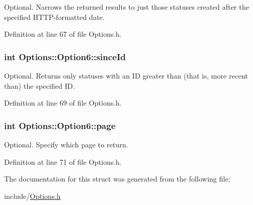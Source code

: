 Optional. Narrows the returned results to just those statuses created after the specified HTTP-formatted date. 



Definition at line 67 of file Options.h.\hypertarget{structOptions_1_1Option6_a6563c79abda8f378cab3b5767aecf54}{
\subsubsection{\setlength{\rightskip}{0pt plus 5cm}int {\bf Options::Option6::sinceId}}}
\label{structOptions_1_1Option6_a6563c79abda8f378cab3b5767aecf54}


Optional. Returns only statuses with an ID greater than (that is, more recent than) the specified ID. 



Definition at line 69 of file Options.h.\hypertarget{structOptions_1_1Option6_72e8612312c4d7b09a6a2611bddd38df}{
\subsubsection{\setlength{\rightskip}{0pt plus 5cm}int {\bf Options::Option6::page}}}
\label{structOptions_1_1Option6_72e8612312c4d7b09a6a2611bddd38df}


Optional. Specify which page to return. 



Definition at line 71 of file Options.h.

The documentation for this struct was generated from the following file:\begin{CompactItemize}
\item 
include/\hyperlink{Options_8h}{Options.h}\end{CompactItemize}
